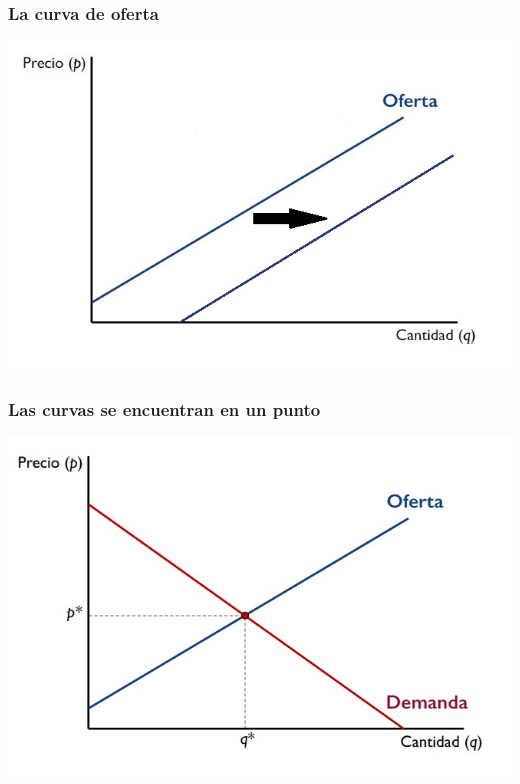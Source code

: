 \documentclass{beamer}
\begin{document}
\begin{frame}
\frametitle{ La curva de oferta}
\includegraphics[scale=0.6]{Figures/Tema_07.2_curvadeofertanew.jpg}
\end{frame} 

\begin{frame}
\frametitle{ Las curvas se encuentran en un punto}
\includegraphics[scale=0.6]{Figures/Tema_07.3_equilibrioofertademanda_0.jpg}
\end{frame}
\end{document}
